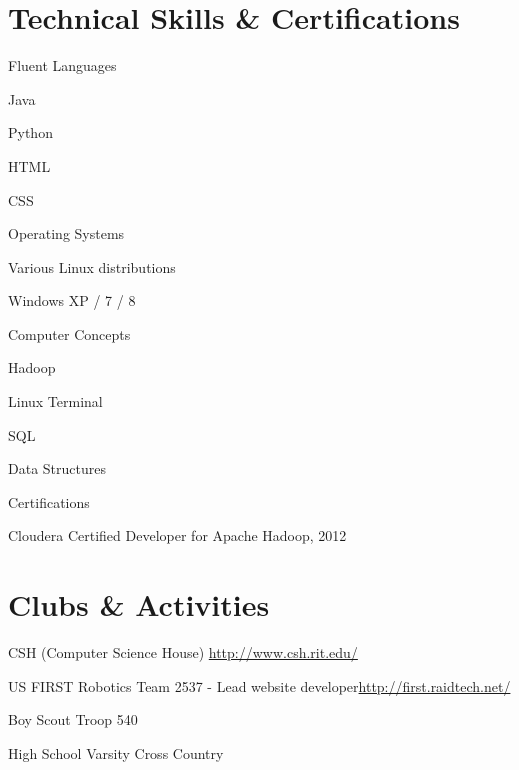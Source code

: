 \documentclass[a4paper,margin,line,11pt]{resume}
\newcommand{\rurl}[1]{\hfill {\footnotesize \url{#1}}}
\begin{document}
\begin{resume}
\section{\mysidestyle Technical Skills \& Certifications}
	\begin{compactdesc}
		\item[Fluent Languages] \begin{inparaenum} { \small
			\item Java
			\item Python
			\item HTML
			\item CSS
		} \end{inparaenum}
		\item[Operating Systems] \begin{inparaenum} { \small
			\item Various Linux distributions
			\item Windows XP / 7 / 8
		} \end{inparaenum}
		\item[Computer Concepts] \begin{inparaenum} { \small
			\item Hadoop
			\item Linux Terminal
			\item SQL
			\item Data Structures
		} \end{inparaenum}
		\item[Certifications] \begin{inparaenum} { \small
			\item Cloudera Certified Developer for Apache Hadoop, 2012
		} \end{inparaenum}
	\end{compactdesc}

\section{\mysidestyle Clubs \& Activities}
	\begin{asparablank}
		\item CSH ({\small Computer Science House}) \rurl{http://www.csh.rit.edu/}
		\item US FIRST Robotics Team 2537 - {\small Lead website developer}\rurl{http://first.raidtech.net/}
		\item Boy Scout Troop 540
		\item High School Varsity Cross Country
	\end{asparablank}


\end{resume}
\end{document}
